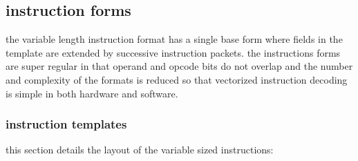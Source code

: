 \newpage
\subsection{instruction forms}

the variable length instruction format has a single base form where
fields in the template are extended by successive instruction packets.
the instructions forms are super regular in that operand and opcode
bits do not overlap and the number and complexity of the formats is
reduced so that vectorized instruction decoding is simple in both
hardware and software.

\subsubsection{instruction templates}

this section details the layout of the variable sized instructions:

